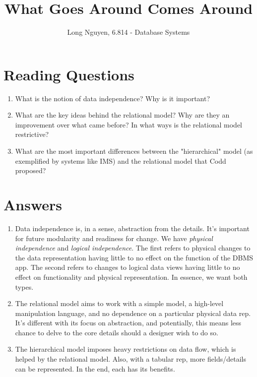 \documentclass{article}
\title{What Goes Around Comes Around}
\author{Long Nguyen, 6.814 - Database Systems}
\begin{document}
\maketitle

\section*{Reading Questions}

\begin{enumerate}
  \item What is the notion of data independence? Why is it important?
  \item What are the key ideas behind the relational model? Why are they an improvement over what came before? In what ways is the relational model restrictive?
  \item What are the most important differences between the "hierarchical" model (as exemplified by systems like IMS) and the relational model that Codd proposed?
\end{enumerate}

\section*{Answers}

\begin{enumerate}
  \item Data independence is, in a sense, abstraction from the details. It's important for future modularity and readiness for change. We have \emph{physical independence} and \emph{logical independence}. The first refers to physical changes to the data representation having little to no effect on the function of the DBMS app. The second refers to changes to logical data views having little to no effect on functionality and physical representation. In essence, we want both types.
  \item The relational model aims to work with a simple model, a high-level manipulation language, and no dependence on a particular physical data rep. It's different with its focus on abstraction, and potentially, this means less chance to delve to the core details should a designer wish to do so.
  \item The hierarchical model imposes heavy restrictions on data flow, which is helped by the relational model. Also, with a tabular rep, more fields/details can be represented. In the end, each has its benefits.
\end{enumerate}
\end{document}
